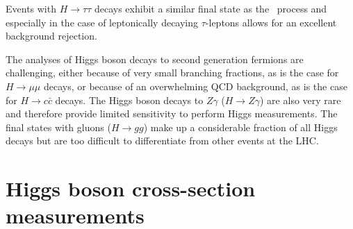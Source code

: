 Events with $H \to \tau\tau $ decays exhibit a similar final state as the \HWW\ process and especially in the case of leptonically decaying $\tau$-leptons allows for an excellent background rejection. 

The analyses of Higgs boson decays to second generation fermions are challenging, either because of very small branching fractions, as is the case for $H \to \mu\mu$ decays, or because of an overwhelming QCD background, as is the case for $H \to c\bar{c}$ decays.
The Higgs boson decays to $Z\gamma$ ($H \to Z\gamma$) are also very rare and therefore provide limited sensitivity to perform Higgs measurements.
The final states with gluons ($H \to gg$) make up a considerable fraction of all Higgs decays but are too difficult to differentiate from other events at the LHC.


\section{Higgs boson cross-section measurements}
\label{subsec:xsec-measurements}



